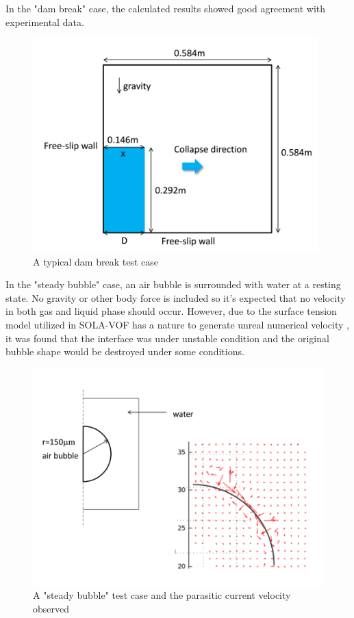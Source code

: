 \documentclass[a4,14pt]{extarticle}
\begin{document}
In the "dam break" case, the calculated results showed good agreement with experimental
data\cite{dambreakexp}. 

\begin{figure}[h!]
  \centering
  \includegraphics[width=11cm]{dam_break.png}
  \caption{A typical dam break test case}
  \label{fig:dam_break}
\end{figure}

In the "steady bubble" case, an air bubble is surrounded with water at a resting state.
No gravity or other body force is included so it's expected that no velocity in both
gas and liquid phase should occur. However, due to the surface tension model utilized in
SOLA-VOF has a nature to generate unreal numerical velocity \cite{Brackbill1992335}, it was
found that the interface was under unstable condition and the original bubble shape would be destroyed
under some conditions.

\begin{figure}[h!]
  \centering
  \includegraphics[width=12cm]{steady_bubble.png}
  \caption{A "steady bubble" test case and the parasitic current velocity observed}
  \label{fig:steady_bubble}
\end{figure}
\end{document}
